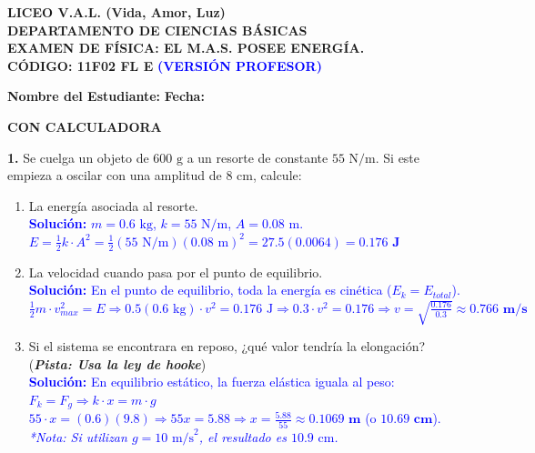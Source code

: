 \documentclass[11pt, letterpaper]{article}
\begin{document}
	
	\begin{center}
		{\Large \textbf{LICEO V.A.L. (Vida, Amor, Luz)}}\\[0.1cm]
		{\large \textbf{DEPARTAMENTO DE CIENCIAS BÁSICAS}}\\[0.1cm]
		{\large \textbf{EXAMEN DE FÍSICA: EL M.A.S. POSEE ENERGÍA.}}\\[0.1cm]
		\hfill \textbf{CÓDIGO: 11F02 FL E} \textcolor{blue}{\textbf{(VERSIÓN PROFESOR)}}
	\end{center}
	
	\vspace{0.3cm}
	\noindent \textbf{Nombre del Estudiante:} \underline{\hspace{8.5cm}} \textbf{Fecha:} \underline{\hspace{3cm}}
	
	\vspace{0.2cm}
	\hfill \textbf{CON CALCULADORA}
	\vspace{0.6cm}
	
	\noindent \textbf{1.} Se cuelga un objeto de $600\text{ g}$ a un resorte de constante $55\text{ N/m}$. Si este empieza a oscilar con una amplitud de $8\text{ cm}$, calcule:
	\begin{enumerate}[label=\alph*), itemsep=0.3cm, leftmargin=0.8cm]
		\item La energía asociada al resorte.\\
		\textcolor{blue}{\textbf{Solución:}  $m = 0.6 \text{ kg}$, $k = 55 \text{ N/m}$, $A = 0.08 \text{ m}$.\\
			$E = \frac{1}{2} k \cdot A^2 = \frac{1}{2}(55 \text{ N/m})(0.08 \text{ m})^2 = 27.5(0.0064) = \mathbf{0.176 \text{ J}}$}
		
		\item La velocidad cuando pasa por el punto de equilibrio.\\
		\textcolor{blue}{\textbf{Solución:} En el punto de equilibrio, toda la energía es cinética ($E_k = E_{total}$).\\
			$\frac{1}{2} m \cdot v_{max}^2 = E \Rightarrow 0.5(0.6 \text{ kg}) \cdot v^2 = 0.176 \text{ J} \Rightarrow 0.3 \cdot v^2 = 0.176 \Rightarrow v = \sqrt{\frac{0.176}{0.3}} \approx \mathbf{0.766 \text{ m/s}}$}
		
		\item Si el sistema se encontrara en reposo, ¿qué valor tendría la elongación?(\textbf{\textit{Pista: Usa la ley de hooke}})\\
		\textcolor{blue}{\textbf{Solución:} En equilibrio estático, la fuerza elástica iguala al peso: $F_k = F_g \Rightarrow k \cdot x = m \cdot g$\\
			$55 \cdot x = (0.6)(9.8) \Rightarrow 55x = 5.88 \Rightarrow x = \frac{5.88}{55} \approx \mathbf{0.1069 \text{ m}}$ (o $\mathbf{10.69 \text{ cm}}$).\\
			\textit{*Nota: Si utilizan $g=10 \text{ m/s}^2$, el resultado es $10.9 \text{ cm}$.}}
	\end{enumerate}
	
\end{document}
